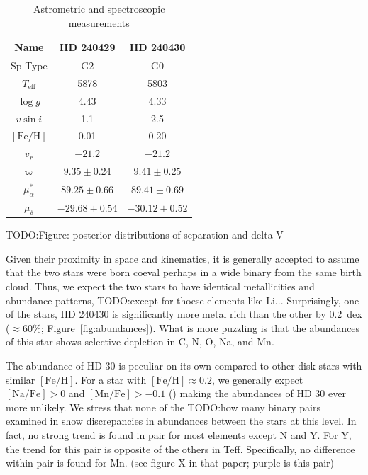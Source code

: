 \documentclass[manuscript]{aastex6}
\newcommand*\elem[1]{\ensuremath{\mathrm{#1}}}
\newcommand{\todo}[1]{{\color{blue}TODO:#1}}
\begin{document}
\begin{table}[htpb]
  \centering
  \caption{Astrometric and spectroscopic measurements}
  \label{tab:t2}
  \begin{tabular}{ccc}
\hline\hline
Name & HD 240429 & HD 240430 \\
\hline
Sp Type & G2 & G0 \\
$T_\mathrm{eff}$ & 5878 & 5803 \\
$\log{g}$ & 4.43 & 4.33 \\
$v\sin{i}$ & 1.1 & 2.5 \\
$[\elem{Fe}/\elem{H}]$ & 0.01 & 0.20 \\
$v_r$ & $-21.2$ & $-21.2$ \\
$\varpi$ & $9.35 \pm 0.24$ & $9.41 \pm 0.25$ \\
$\mu_\alpha^*$ & $89.25 \pm 0.66$ & $89.41 \pm 0.69$ \\
$\mu_\delta$  & $-29.68 \pm 0.54$ & $-30.12 \pm 0.52$\\
\hline\hline
\end{tabular}
\end{table}

\todo{Figure: posterior distributions of separation and delta V}

Given their proximity in space and kinematics,
it is generally accepted to assume that the two stars were born coeval
perhaps in a wide binary from the same birth cloud.
Thus, we expect the two stars to have identical metallicities and abundance patterns,
\todo{except for thoese elements like Li...}
Surprisingly, one of the stars, HD 240430 is significantly more metal
rich than the other by 0.2~dex ($\approx 60\%$; Figure~\ref{fig:abundances}).
What is more puzzling is that the abundances of this star
shows selective depletion in C, N, O, Na, and Mn.

The abundance of HD 30 is peculiar on its own compared to other disk stars with
similar $[\elem{Fe}/\elem{H}]$.
For a star with $[\elem{Fe}/\elem{H}] \approx 0.2$, we generally expect
$[\elem{Na}/\elem{Fe}] > 0$ and $[\elem{Mn}/\elem{Fe}] > -0.1$
(\citealt{Battistini:2015aa,Bensby:2003aa}) making the abundances of HD 30 ever more unlikely.
We stress that none of the \todo{how many} binary pairs examined in \citealt{2016ApJS..225...32B}
show discrepancies in abundances between the stars at this level.
In fact, no strong trend is found in pair for most elements
except N and Y.
For Y, the trend for this pair is opposite of the others in Teff.
Specifically, no difference within pair is found for Mn.
(see figure X in that paper; purple is this pair)
\end{document}
